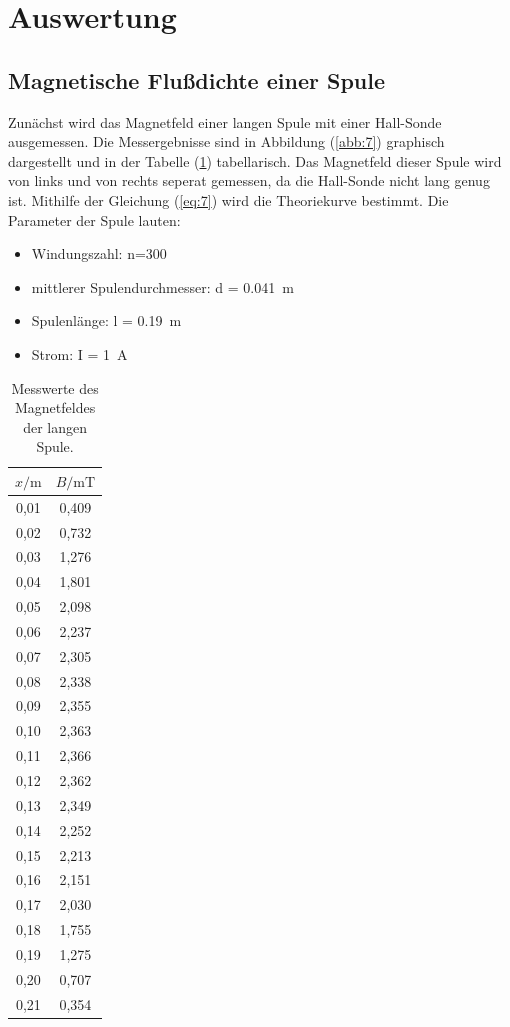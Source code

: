 \section{Auswertung}
\subsection{Magnetische Flußdichte einer Spule}

Zunächst wird das Magnetfeld einer langen Spule mit einer Hall-Sonde ausgemessen.
Die Messergebnisse sind in Abbildung (\ref{abb:7}) graphisch dargestellt und in der
Tabelle (\ref{tab:1}) tabellarisch. Das Magnetfeld dieser Spule wird von links und
von rechts seperat gemessen, da die Hall-Sonde nicht lang genug ist. Mithilfe
der Gleichung (\ref{eq:7}) wird die Theoriekurve bestimmt. Die Parameter der Spule lauten:

\begin{itemize}
  \item Windungszahl: n=300
  \item mittlerer Spulendurchmesser: d = \SI{0.041}{\meter}
  \item Spulenlänge: l = \SI{0.19}{\meter}
  \item Strom: I = \SI{1}{\ampere}
\end{itemize}

\begin{table}[H]
  \centering
  \caption{Messwerte des Magnetfeldes der langen Spule.}
  \label{tab:1}
  \begin{tabular}{c c}
    \toprule
    $x/\si{\meter}$ & $B/\si{\milli\tesla}$ \\
    \midrule
    0,01 & 0,409 \\
    0,02 & 0,732 \\
    0,03 & 1,276 \\
    0,04 & 1,801 \\
    0,05 & 2,098 \\
    0,06 & 2,237 \\
    0,07 & 2,305 \\
    0,08 & 2,338 \\
    0,09 & 2,355 \\
    0,10 & 2,363 \\
    0,11 & 2,366 \\
    0,12 & 2,362 \\
    0,13 & 2,349 \\
    0,14 & 2,252 \\
    0,15 & 2,213 \\
    0,16 & 2,151 \\
    0,17 & 2,030 \\
    0,18 & 1,755 \\
    0,19 & 1,275 \\
    0,20 & 0,707 \\
    0,21 & 0,354 \\
    \bottomrule
  \end{tabular}
\end{table}

